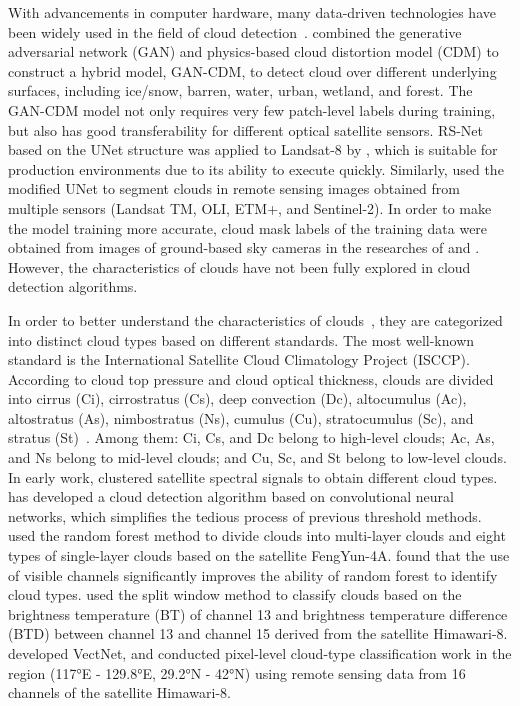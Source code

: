 \documentclass[review]{elsarticle}
\begin{document}
With advancements in computer hardware, many data-driven technologies have been widely used in the field of cloud detection~\citep{SEGALROZENHAIMER2020111446, LI2020112045, WU2022218, KANU2020100417, MATEOGARCIA20201}.
\citet{LI2022113197} combined the generative adversarial network (GAN) and physics-based cloud distortion model (CDM) to construct a hybrid model, GAN-CDM, to detect cloud over different underlying surfaces, including ice/snow, barren, water, urban, wetland, and forest.
The GAN-CDM model not only requires very few patch-level labels during training, but also has good transferability for different optical satellite sensors.
RS-Net based on the UNet structure was applied to Landsat-8 by \citet{Jeppesen2019247}, which is suitable for production environments due to its ability to execute quickly.
Similarly, \citet{Wieland2019111203} used the modified UNet to segment clouds in remote sensing images obtained from multiple sensors (Landsat TM, OLI, ETM+, and Sentinel-2).
In order to make the model training more accurate, cloud mask labels of the training data were obtained from images of ground-based sky cameras in the researches of \citet{Dev20191814} and \citet{SKAKUN2021102253}. However, the characteristics of clouds have not been fully explored in cloud detection algorithms.

In order to better understand the characteristics of clouds~\citep{Wang2016JD025239, Wang2019JD030457, Teng2020GL088941, Ding10020783, Khatri2017JD028165}, they are categorized into distinct cloud types based on different standards.
The most well-known standard is the International Satellite Cloud Climatology Project (ISCCP).
According to cloud top pressure and cloud optical thickness, clouds are divided into cirrus (Ci), cirrostratus (Cs), deep convection (Dc), altocumulus (Ac), altostratus (As), nimbostratus (Ns), cumulus (Cu), stratocumulus (Sc), and stratus (St)~\citep{RossowISCCP, Wang200140}.
Among them: Ci, Cs, and Dc belong to high-level clouds; Ac, As, and Ns belong to mid-level clouds; and Cu, Sc, and St belong to low-level clouds.
In early work, \citet{Jun1990} clustered satellite spectral signals to obtain different cloud types.
\citet{Segal2020111446} has developed a cloud detection algorithm based on convolutional neural networks, which simplifies the tedious process of previous threshold methods.
\citet{YuZhuofu2021} used the random forest method to divide clouds into multi-layer clouds and eight types of single-layer clouds based on the satellite FengYun-4A.
\citet{Zhang20196464} found that the use of visible channels significantly improves the ability of random forest to identify cloud types.
\citet{Purbantoro8898451} used the split window method to classify clouds based on the brightness temperature (BT) of channel 13 and brightness temperature difference (BTD) between channel 13 and channel 15 derived from the satellite Himawari-8.
\citet{Wang9554737} developed VectNet, and conducted pixel-level cloud-type classification work in the region (117°E - 129.8°E, 29.2°N - 42°N) using remote sensing data from 16 channels of the satellite Himawari-8.
\end{document}
